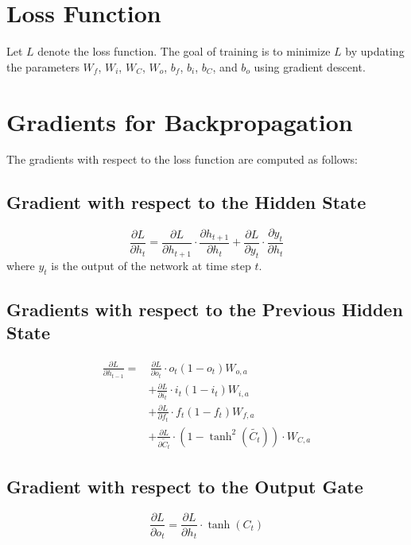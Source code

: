 \documentclass{article}
\begin{document}
\section{Loss Function}
Let \(L\) denote the loss function. The goal of training is to minimize \(L\) by updating the parameters \(W_f\), \(W_i\), \(W_C\), \(W_o\), \(b_f\), \(b_i\), \(b_C\), and \(b_o\) using gradient descent.

\section{Gradients for Backpropagation}
The gradients with respect to the loss function are computed as follows:

\subsection{Gradient with respect to the Hidden State}
\begin{equation}
	\frac{\partial L}{\partial h_t} = \frac{\partial L}{\partial h_{t+1}} \cdot \frac{\partial h_{t+1}}{\partial h_t} + \frac{\partial L}{\partial y_t} \cdot \frac{\partial y_t}{\partial h_t}
\end{equation}
where \(y_t\) is the output of the network at time step \(t\).

\subsection{Gradients with respect to the Previous Hidden State}
\begin{equation}
\begin{aligned}
	    \frac{\partial L}{\partial h_{t-1}} = & \, \frac{\partial L}{\partial o_t} \cdot o_t (1-o_t) W_{o,a} \\
	&+ \frac{\partial L}{\partial i_t} \cdot i_t (1-i_t) W_{i,a} \\
	&+ \frac{\partial L}{\partial f_t} \cdot  f_t (1-f_t) W_{f,a} \\
	&+ \frac{\partial L}{\partial \tilde{C}_t} \cdot (1-\tanh^2(\tilde{C_t})) \cdot W_{C,a}
\end{aligned}
\end{equation}



\subsection{Gradient with respect to the Output Gate}
\begin{equation}
	\frac{\partial L}{\partial o_t} = \frac{\partial L}{\partial h_t} \cdot \tanh(C_t)
\end{equation}
\end{document}
